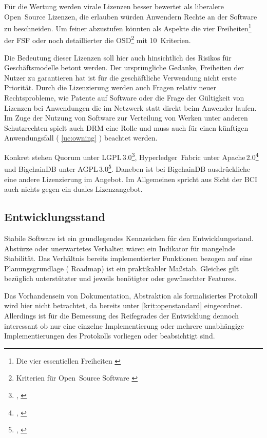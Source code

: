 Für die Wertung werden virale Lizenzen besser bewertet als liberalere Open~Source Lizenzen, die erlauben würden Anwendern Rechte an der Software zu beschneiden.
Um feiner abzustufen könnten als Aspekte die vier Freiheiten\footnote{Die vier essentiellen Freiheiten \autocite{w:fsf-freedoms}} der \gls{FSF}
oder noch detaillierter die \gls{OSD}\footnote{Kriterien für Open~Source Software \autocite{w:iso-osd}} mit 10~Kriterien.

Die Bedeutung dieser Lizenzen soll hier auch hinsichtlich des Risikos für Geschäftsmodelle betont werden.
Der ursprüngliche Gedanke, Freiheiten der Nutzer zu garantieren hat ist für die geschäftliche Verwendung nicht erste Priorität.
Durch die Lizenzierung werden auch Fragen relativ neuer Rechtsprobleme, wie Patente auf Software oder die Frage der Gültigkeit von Lizenzen bei Anwendungen die im Netzwerk statt direkt beim Anwender laufen.
Im Zuge der Nutzung von Software zur Verteilung von Werken unter anderen Schutzrechten spielt auch \gls{DRM} eine Rolle und muss auch für einen künftigen Anwendungsfall (\zB{} \ref{uc:owning} ) beachtet werden.

Konkret stehen Quorum unter LGPL\,3.0\footnote{\cite{w:license:lgpl3}, \cite{w:quorum-jpmorgan:github}}, Hyperledger~Fabric unter Apache\,2.0\footnote{\cite{w:license:al2}, \cite{w:hyperledger-fabric:github}} und BigchainDB unter AGPL\,3.0\footnote{\cite{w:license:agpl3}, \cite{w:bigchaindb:github}}. Daneben ist bei BigchainDB ausdrückliche eine andere Lizenzierung im Angebot. Im Allgemeinen spricht aus Sicht der \gls{BCI} auch nichts gegen ein duales Lizenzangebot.

\subsection{Entwicklungsstand}\label{krit:entwicklungsstand}

Stabile Software ist ein grundlegendes Kennzeichen für den Entwicklungsstand.
Abstürze oder unerwartetes Verhalten wären ein Indikator für mangelnde Stabilität.
Das Verhältnis bereits implementierter Funktionen bezogen auf eine Planungsgrundlage (\zB{} Roadmap) ist ein praktikabler Maßstab.
Gleiches gilt bezüglich unterstützter und jeweils benötigter oder gewünschter Features.

Das Vorhandensein von Dokumentation, Abstraktion als formalisiertes Protokoll wird hier nicht betrachtet, da bereits unter
\ref{krit:openstandard} eingeordnet.
Allerdings ist für die Bemessung des Reifegrades der Entwicklung dennoch interessant ob nur eine einzelne Implementierung oder mehrere unabhängige Implementierungen des Protokolls vorliegen oder beabsichtigt sind.


